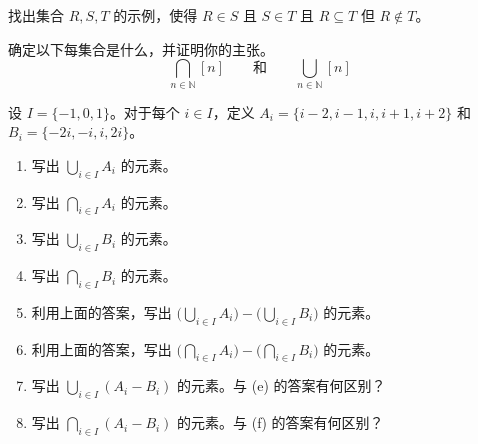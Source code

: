 \begin{exercise}
    找出集合 $R,S,T$ 的示例，使得 $R \in S$ 且 $S \in T$ 且 $R \subseteq T$ 但 $R \notin T$。
\end{exercise}

\begin{exercise}
    确定以下每集合是什么，并证明你的主张。
    \[\bigcap_{n \in \mathbb{N}}[n] \qquad \text{和} \qquad \bigcup_{n \in \mathbb{N}}[n]\]
\end{exercise}

\begin{exercise}
    设 $I = \{-1, 0, 1\}$。对于每个 $i \in I$，定义 $A_i = \{i - 2, i - 1, i, i + 1, i + 2\}$ 和 $B_i = \{-2i, -i, i, 2i\}$。
    \begin{enumerate}[label=(\alph*)]
        \item 写出 $\displaystyle{\bigcup_{i \in I}A_i}$ 的元素。
        \item 写出 $\displaystyle{\bigcap_{i \in I}A_i}$ 的元素。
        \item 写出 $\displaystyle{\bigcup_{i \in I}B_i}$ 的元素。
        \item 写出 $\displaystyle{\bigcap_{i \in I}B_i}$ 的元素。
        \item 利用上面的答案，写出 $\displaystyle{\Big(\bigcup_{i \in I}A_i\Big) - \Big(\bigcup_{i \in I}B_i\Big)}$ 的元素。
        \item 利用上面的答案，写出 $\displaystyle{\Big(\bigcap_{i \in I}A_i\Big) - \Big(\bigcap_{i \in I}B_i\Big)}$ 的元素。
        \item 写出 $\displaystyle{\bigcup_{i \in I}(A_i - B_i)}$ 的元素。与 (e) 的答案有何区别？
        \item 写出 $\displaystyle{\bigcap_{i \in I}(A_i - B_i)}$ 的元素。与 (f) 的答案有何区别？
    \end{enumerate}
\end{exercise}

